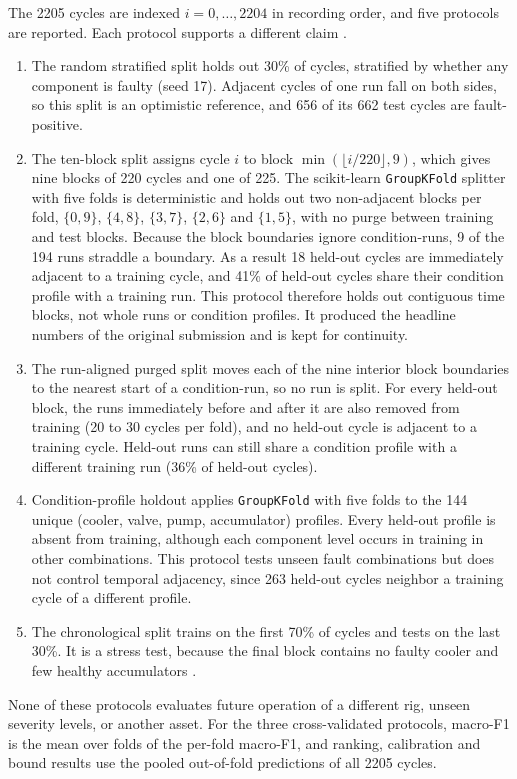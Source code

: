 \documentclass[journal]{IEEEtran}
\begin{document}
The 2205 cycles are indexed $i=0,\dots,2204$ in recording order, and five protocols
are reported. Each protocol supports a different claim \cite{Kaufman2012Leakage,Roberts2017CVStrategies}.
\begin{enumerate}
    \item The random stratified split holds out 30\% of cycles, stratified by whether
    any component is faulty (seed 17). Adjacent cycles of one run fall on both sides,
    so this split is an optimistic reference, and 656 of its 662 test cycles are
    fault-positive.
    \item The ten-block split assigns cycle $i$ to block $\min(\lfloor i/220\rfloor,9)$,
    which gives nine blocks of 220 cycles and one of 225. The scikit-learn
    \texttt{GroupKFold} splitter with five folds is deterministic and holds out two
    non-adjacent blocks per fold, $\{0,9\}$, $\{4,8\}$, $\{3,7\}$, $\{2,6\}$ and
    $\{1,5\}$, with no purge between training and test blocks. Because the block
    boundaries ignore condition-runs, 9 of the 194 runs straddle a boundary. As a
    result 18 held-out cycles are immediately adjacent to a training cycle, and 41\% of
    held-out cycles share their condition profile with a training run. This protocol
    therefore holds out contiguous time blocks, not whole runs or condition profiles.
    It produced the headline numbers of the original submission and is kept for
    continuity.
    \item The run-aligned purged split moves each of the nine interior block
    boundaries to the nearest start of a condition-run, so no run is split. For every
    held-out block, the runs immediately before and after it are also removed from
    training (20 to 30 cycles per fold), and no held-out cycle is adjacent to a
    training cycle. Held-out runs can still share a condition profile with a different
    training run (36\% of held-out cycles).
    \item Condition-profile holdout applies \texttt{GroupKFold} with five folds to the
    144 unique (cooler, valve, pump, accumulator) profiles. Every held-out profile is
    absent from training, although each component level occurs in training in other
    combinations. This protocol tests unseen fault combinations but does not control
    temporal adjacency, since 263 held-out cycles neighbor a training cycle of a
    different profile.
    \item The chronological split trains on the first 70\% of cycles and tests on the
    last 30\%. It is a stress test, because the final block contains no faulty cooler
    and few healthy accumulators \cite{MorenoTorres2012UnifyingView,Gama2014ConceptDrift}.
\end{enumerate}
None of these protocols evaluates future operation of a different rig, unseen
severity levels, or another asset. For the three cross-validated protocols,
macro-F1 is the mean over folds of the per-fold macro-F1, and ranking, calibration
and bound results use the pooled out-of-fold predictions of all 2205 cycles.
\end{document}
